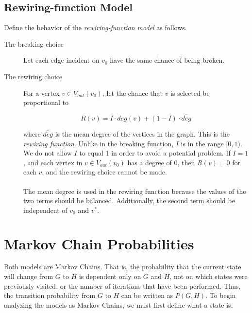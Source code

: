 \documentclass[a4paper,10pt]{article}
\begin{document}
\subsection{Rewiring-function Model}

Define the behavior of the \emph{rewiring-function model} as follows.

\begin{description}
 \item[The breaking choice] Let each edge incident on $v_0$ have the same chance of being broken.

 \item[The rewiring choice] For a vertex $v \in V_{out}(v_0)$, let the chance that $v$ is selected be proportional to

 \begin{equation}
\label{eqn:rewiring-function}
 R(v) = I \cdot deg(v) + (1 - I) \cdot \overline{deg}
 \end{equation}

where $\overline{deg}$ is the mean degree of the vertices in the graph. This is the \emph{rewiring function}. Unlike in the breaking function, $I$ is in the range $[0, 1)$. We do not allow $I$ to equal 1 in order to avoid a potential problem. If $I = 1$, and each vertex in $v \in V_{out}(v_0)$ has a degree of 0, then $R(v) = 0$ for each $v$, and the rewiring choice cannot be made. 
  
\paragraph{} The mean degree is used in the rewiring function because the values of the two terms should be balanced. Additionally, the second term should be independent of $v_0$ and $v^*$.

\end{description}

\section{Markov Chain Probabilities}

Both models are Markov Chains. That is, the probability that the current state will change from $G$ to $H$ is dependent only on $G$ and $H$, not on which states were previously visited, or the number of iterations that have been performed. Thus, the transition probability from $G$ to $H$ can be written as $P(G, H)$. To begin analyzing the models as Markov Chains, we must first define what a state is.
\end{document}

